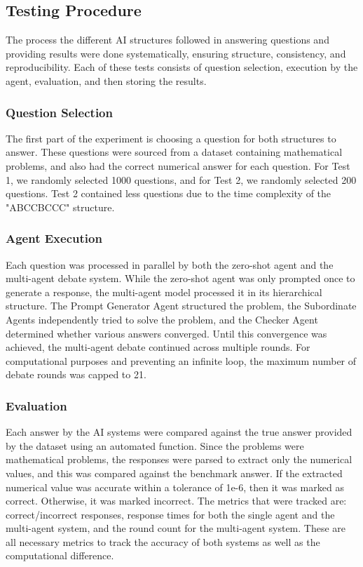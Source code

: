 \subsection{Testing Procedure}
The process the different AI structures followed in answering questions and providing results were done systematically, ensuring structure, consistency, and reproducibility. Each of these tests consists of question selection, execution by the agent, evaluation, and then storing the results.

\subsubsection{Question Selection}
The first part of the experiment is choosing a question for both structures to answer. These questions were sourced from a dataset containing mathematical problems, and also had the correct numerical answer for each question. For Test 1, we randomly selected 1000 questions, and for Test 2, we randomly selected 200 questions. Test 2 contained less questions due to the time complexity of the "ABCCBCCC" structure.

\subsubsection{Agent Execution}
Each question was processed in parallel by both the zero-shot agent and the multi-agent debate system. While the zero-shot agent was only prompted once to generate a response, the multi-agent model processed it in its hierarchical structure. The Prompt Generator Agent structured the problem, the Subordinate Agents independently tried to solve the problem, and the Checker Agent determined whether various answers converged. Until this convergence was achieved, the multi-agent debate continued across multiple rounds. For computational purposes and preventing an infinite loop, the maximum number of debate rounds was capped to 21.

\subsubsection{Evaluation}
Each answer by the AI systems were compared against the true answer provided by the dataset using an automated function. Since the problems were mathematical problems, the responses were parsed to extract only the numerical values, and this was compared against the benchmark answer. If the extracted numerical value was accurate within a tolerance of 1e-6, then it was marked as correct. Otherwise, it was marked incorrect.
The metrics that were tracked are: correct/incorrect responses, response times for both the single agent and the multi-agent system, and the round count for the multi-agent system. These are all necessary metrics to track the accuracy of both systems as well as the computational difference.

